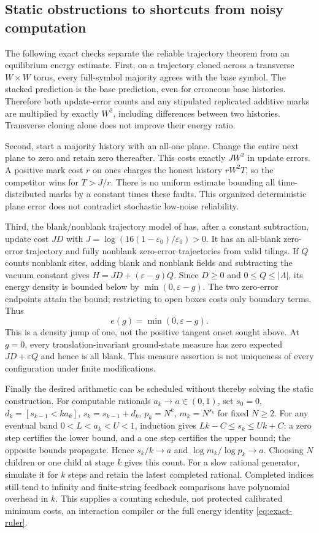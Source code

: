 \subsection{Static obstructions to shortcuts from noisy computation}
The following exact checks separate the reliable trajectory theorem
from an equilibrium energy estimate.
First, on a trajectory cloned across a transverse $W\times W$
torus, every full-symbol majority agrees with the base symbol.
The stacked prediction is the base prediction, even for erroneous
base histories. Therefore both update-error counts and any stipulated
replicated additive marks are multiplied by exactly $W^2$, including
differences between two histories. Transverse cloning alone does
not improve their energy ratio.

Second, start a majority history with an all-one plane. Change the
entire next plane to zero and retain zero thereafter. This costs
exactly $JW^2$ in update errors. A positive mark cost $r$ on ones
charges the honest history $rW^2T$, so the competitor wins for
$T>J/r$. There is no uniform estimate bounding all time-distributed
marks by a constant times these faults. This organized deterministic
plane error does not contradict stochastic low-noise reliability.

Third, the blank/nonblank trajectory model of
\cite[equation~(13), Sections~3.2 and~4]{thermalTrajectories} has,
after a constant subtraction, update cost $JD$ with
$J=\log(16(1-\varepsilon_0)/\varepsilon_0)>0$. It has an all-blank
zero-error trajectory and fully nonblank zero-error trajectories
from valid tilings. If $Q$ counts nonblank sites, adding blank and
nonblank fields and subtracting the vacuum constant gives
$H=JD+(\varepsilon-g)Q$. Since $D\geq0$ and
$0\leq Q\leq|\Lambda|$, its energy density is bounded below by
$\min(0,\varepsilon-g)$. The two zero-error endpoints attain the
bound; restricting to open boxes costs only boundary terms. Thus
\[
 e(g)=\min(0,\varepsilon-g).
\]
This is a density jump of one, not the positive tangent onset sought
above. At $g=0$, every translation-invariant ground-state measure
has zero expected $JD+\varepsilon Q$ and hence is all blank.
This measure assertion is not uniqueness of every configuration
under finite modifications.

Finally the desired arithmetic can be scheduled without thereby
solving the static construction. For computable rationals $a_k\to
a\in(0,1)$, set $s_0=0$,
$d_k=[s_{k-1}<ka_k]$, $s_k=s_{k-1}+d_k$,
$p_k=N^k$, $m_k=N^{s_k}$ for fixed $N\geq2$.
For any eventual band $0<L<a_k<U<1$, induction gives
$Lk-C\leq s_k\leq Uk+C$: a zero step certifies the lower bound,
and a one step certifies the upper bound; the opposite bounds
propagate. Hence $s_k/k\to a$ and $\log m_k/\log p_k\to a$.
Choosing $N$ children or one child at stage $k$ gives this count.
For a slow rational generator, simulate it for $k$ steps and retain
the latest completed rational. Completed indices still tend to
infinity and finite-string feedback comparisons have polynomial
overhead in $k$. This supplies a counting schedule, not protected
calibrated minimum costs, an interaction compiler or the full
energy identity \eqref{eq:exact-ruler}.

